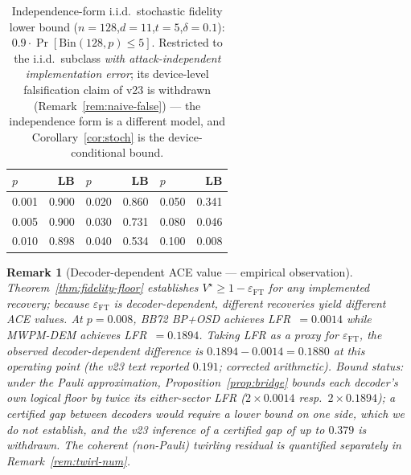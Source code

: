 \documentclass[11pt,a4paper]{article}
\newtheorem{remark}{Remark}
\begin{document}
\begin{table}[H]\centering\small
\caption{Independence-form i.i.d.\ stochastic fidelity lower bound
  ($n=128$,$d=11$,$t=5$,$\delta=0.1$): $0.9\cdot\Pr[\mathrm{Bin}(128,p)\le5]$.
  Restricted to the i.i.d.\ subclass \emph{with attack-independent
  implementation error}; its device-level falsification claim of v23 is
  withdrawn (Remark~\ref{rem:naive-false}) --- the independence form is
  a different model, and Corollary~\ref{cor:stoch} is the
  device-conditional bound.}\label{tab:minimax}
\begin{tabular}{@{}lrlrlr@{}}
\toprule
$p$ & LB & $p$ & LB & $p$ & LB \\\midrule
0.001 & 0.900 & 0.020 & 0.860 & 0.050 & 0.341 \\
0.005 & 0.900 & 0.030 & 0.731 & 0.080 & 0.046 \\
0.010 & 0.898 & 0.040 & 0.534 & 0.100 & 0.008 \\\bottomrule
\end{tabular}
\end{table}

\begin{remark}[Decoder-dependent ACE value --- empirical observation]
\label{rem:decoder-gap}
Theorem~\ref{thm:fidelity-floor} establishes $V^\star\ge1-\varepsilon_{\mathrm{FT}}$
for any implemented recovery; because $\varepsilon_{\mathrm{FT}}$ is
decoder-dependent, different recoveries yield different ACE values.
At $p=0.008$, BB72 BP+OSD achieves LFR~$=0.0014$ while MWPM-DEM achieves
LFR~$=0.1894$.
Taking LFR as a proxy for $\varepsilon_{\mathrm{FT}}$, the observed
decoder-dependent difference is $0.1894-0.0014=0.1880$ at this
operating point (the v23 text reported $0.191$; corrected arithmetic).
\emph{Bound status:} under the Pauli approximation,
Proposition~\ref{prop:bridge} bounds each decoder's own logical floor
by twice its either-sector LFR ($2\times0.0014$ resp.\
$2\times0.1894$); a \emph{certified gap between decoders} would require
a lower bound on one side, which we do not establish, and the v23
inference of a certified gap of up to $0.379$ is withdrawn. The
coherent (non-Pauli) twirling residual is quantified separately in
Remark~\ref{rem:twirl-num}.
\end{remark}
\end{document}
